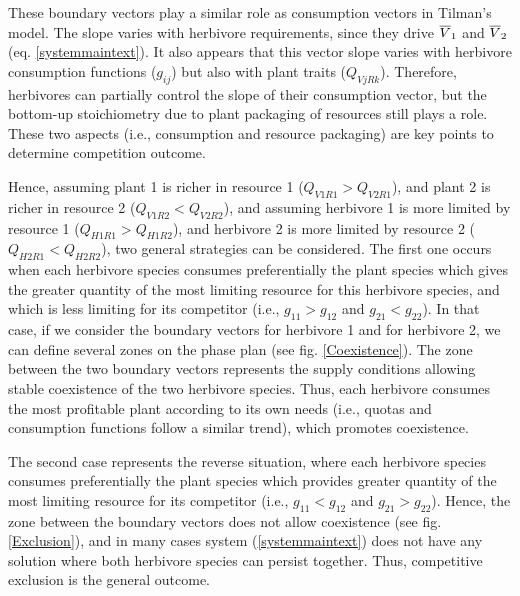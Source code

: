 \documentclass[12pt]{article}
\newcommand\barre[1]{\overline{\rule{0pt}{1.5ex}#1}}
\begin{document}
These boundary vectors play a similar role as consumption vectors in Tilman's model. %
The slope varies with herbivore requirements, since they drive $\barre{V}_1$ and $\barre{V}_2$ (eq. \ref{systemmaintext}). It also appears that this vector slope varies with herbivore consumption functions ($g_{ij}$) but also with plant traits ($Q_{VjRk}$). Therefore, herbivores can partially control the slope of their consumption vector, but the bottom-up stoichiometry due to plant packaging of resources still plays a role. 
These two aspects (i.e., consumption and resource packaging) are key points to determine competition outcome. 
\par
Hence, assuming plant 1 is richer in resource 1 ($Q_{V1R1}>Q_{V2R1}$), and plant 2 is richer in resource 2 ($Q_{V1R2}<Q_{V2R2}$), and assuming herbivore 1 is more limited by resource 1 ($Q_{H1R1}>Q_{H1R2}$), and herbivore 2 is more limited by resource 2 ($Q_{H2R1}<Q_{H2R2}$), two general strategies can be considered. The first one occurs when each herbivore species consumes preferentially the plant species which gives the greater quantity of the most limiting resource for this herbivore species, and which is less limiting for its competitor (i.e., $g_{11}>g_{12}$ and $g_{21}<g_{22}$). In that case, if we consider the boundary vectors for herbivore 1 and for herbivore 2, we can define several zones on the phase plan (see fig. \ref{Coexistence}). The zone between the two boundary vectors represents the supply conditions allowing stable coexistence of the two herbivore species. Thus, each herbivore consumes the most profitable plant according to its own needs (i.e., quotas and consumption functions follow a similar trend), %
which promotes coexistence.
\par
The second case represents the reverse situation, where each herbivore species consumes preferentially the plant species which provides greater quantity of the most limiting resource for its competitor (i.e., $g_{11}<g_{12}$ and $g_{21}>g_{22}$). Hence, the zone between the boundary vectors does not allow coexistence (see fig.  \ref{Exclusion}), and in many cases system (\ref{systemmaintext}) does not have any solution where both herbivore species can persist together. Thus, competitive exclusion is the general outcome. 
\end{document}
